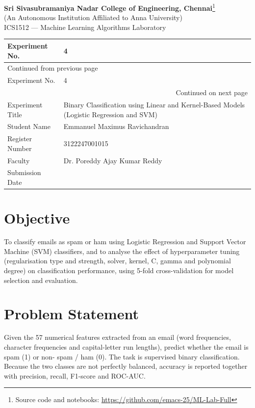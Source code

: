 \documentclass[11pt]{article}
\author{root}
\date{\today}
\title{}
\begin{document}
\begin{center}{\Large\bfseries Sri Sivasubramaniya Nadar College of Engineering, Chennai}\footnote{Source code and notebooks: \url{https://github.com/emacs-25/ML-Lab-Full}}\\[2pt]
(An Autonomous Institution Affiliated to Anna University)\\[2pt]
{\large ICS1512 --- Machine Learning Algorithms Laboratory}\end{center}

\begin{longtable}{|p{4cm}|p{11cm}|}
\hline
Experiment No. & 4\\[0pt]
\hline
\endfirsthead
\multicolumn{2}{l}{Continued from previous page} \\[0pt]
\hline

Experiment No. & 4 \\[0pt]

\hline
\endhead
\hline\multicolumn{2}{r}{Continued on next page} \\
\endfoot
\endlastfoot
\hline
Experiment Title & Binary Classification using Linear and Kernel-Based Models (Logistic Regression and SVM)\\[0pt]
\hline
Student Name & Emmanuel Maximus Ravichandran\\[0pt]
\hline
Register Number & 3122247001015\\[0pt]
\hline
Faculty & Dr. Poreddy Ajay Kumar Reddy\\[0pt]
\hline
Submission Date & \\[0pt]
\hline
\end{longtable}

\section*{Objective}
\label{sec:orgcb2c482}


To classify emails as spam or ham using Logistic Regression and Support Vector Machine (SVM)
classifiers, and to analyse the effect of hyperparameter tuning (regularisation type and
strength, solver, kernel, C, gamma and polynomial degree) on classification performance,
using 5-fold cross-validation for model selection and evaluation.

\section*{Problem Statement}
\label{sec:org085e80f}


Given the 57 numerical features extracted from an email (word frequencies, character
frequencies and capital-letter run lengths), predict whether the email is spam (1) or non-
spam / ham (0). The task is supervised binary classification. Because the two classes are
not perfectly balanced, accuracy is reported together with precision, recall, F1-score and
ROC-AUC.
\end{document}
